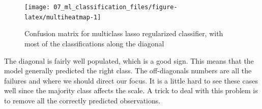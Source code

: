 \documentclass[
]{krantz}
\makeatletter
\newenvironment{Shaded}{\begin{snugshade}}{\end{snugshade}}
\newcommand{\AttributeTok}[1]{\textcolor[rgb]{0.77,0.63,0.00}{#1}}
\newcommand{\ControlFlowTok}[1]{\textcolor[rgb]{0.13,0.29,0.53}{\textbf{#1}}}
\newcommand{\DecValTok}[1]{\textcolor[rgb]{0.00,0.00,0.81}{#1}}
\newcommand{\FunctionTok}[1]{\textcolor[rgb]{0.00,0.00,0.00}{#1}}
\newcommand{\NormalTok}[1]{#1}
\newcommand{\SpecialCharTok}[1]{\textcolor[rgb]{0.00,0.00,0.00}{#1}}
\newcommand{\StringTok}[1]{\textcolor[rgb]{0.31,0.60,0.02}{#1}}
\newenvironment{kframe}{%
\medskip{}
\setlength{\fboxsep}{.8em}
 \def\at@end@of@kframe{}%
 \ifinner\ifhmode%
  \def\at@end@of@kframe{\end{minipage}}%
  \begin{minipage}{\columnwidth}%
 \fi\fi%
 \def\FrameCommand##1{\hskip\@totalleftmargin \hskip-\fboxsep
 \colorbox{shadecolor}{##1}\hskip-\fboxsep
     \hskip-\linewidth \hskip-\@totalleftmargin \hskip\columnwidth}%
 \MakeFramed {\advance\hsize-\width
   \@totalleftmargin\z@ \linewidth\hsize
   \@setminipage}}%
 {\par\unskip\endMakeFramed%
 \at@end@of@kframe}
\renewenvironment{Shaded}{\begin{kframe}}{\end{kframe}}
\makeatother
\begin{document}
\begin{Shaded}
\end{Shaded}

\begin{figure}

{\centering \texttt{[image: 07\_ml\_classification\_files/figure-latex/multiheatmap-1]} 

}

\caption{Confusion matrix for multiclass lasso regularized classifier, with most of the classifications along the diagonal}\label{fig:multiheatmap}
\end{figure}

The diagonal is fairly well populated, which is a good sign. This means that the model generally predicted the right class.
The off-diagonals numbers are all the failures and where we should direct our focus.
It is a little hard to see these cases well since the majority class affects the scale.
A trick to deal with this problem is to remove all the correctly predicted observations.
\end{document}
